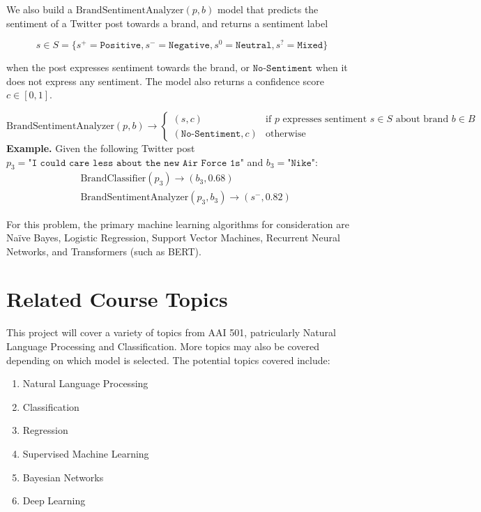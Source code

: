 \documentclass{article}
\begin{document}
We also build a $\mathrm{BrandSentimentAnalyzer}(p, b)$ model that predicts
the sentiment of a Twitter post towards a brand, and returns a sentiment
label

\[
    s \in S =
    \{
    s^{+}=\texttt{Positive},
    s^{-}=\texttt{Negative},
    s^{0}=\texttt{Neutral},
    s^{?}=\texttt{Mixed}
    \}
\]

when the post expresses sentiment towards the brand, or $\texttt{No-Sentiment}$
when it does not express any sentiment. The model also returns a confidence
score $c \in [0, 1]$.

\[
    \mathrm{BrandSentimentAnalyzer}(p, b) \rightarrow \begin{cases}
        (s, c)                     & \text{if } p \text{ expresses sentiment }
        s \in S \text{ about brand } b \in B
        \\
        (\texttt{No-Sentiment}, c) & \text{otherwise}
    \end{cases}
\]
\textbf{Example.} Given the following Twitter post $p_3 = \texttt{"I could
        care less about the new Air Force 1s"}$ and $b_3 = \texttt{"Nike"}$:
\begin{align*}
     & \mathrm{BrandClassifier}(p_3) \rightarrow (b_3, 0.68)               \\
     & \mathrm{BrandSentimentAnalyzer}(p_3, b_3) \rightarrow (s^{-}, 0.82)
\end{align*}

For this problem, the primary machine learning algorithms for consideration are Naïve Bayes, Logistic Regression, Support Vector Machines, Recurrent Neural Networks, and Transformers (such as BERT).

\section*{Related Course Topics}

This project will cover a variety of topics from AAI 501, patricularly Natural Language Processing and Classification. More topics may also be covered depending on which model is selected. The potential topics covered include:
\begin{enumerate}[leftmargin=*]

    \item{Natural Language Processing}
    \item{Classification}
    \item{Regression}
    \item{Supervised Machine Learning}
    \item{Bayesian Networks}
    \item{Deep Learning}
    
\end{enumerate}
\end{document}

